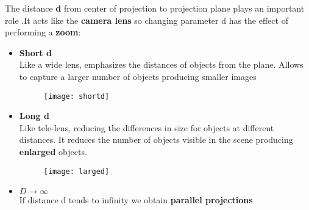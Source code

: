 The distance \textbf{d} from center of projection to projection plane plays an important role .It acts like the \textbf{camera lens}  so changing parameter d has the effect of performing a \textbf{zoom}:\\
\begin{itemize}
\item \textbf{Short d}\\
Like a wide lens, emphasizes the distances of objects from the plane.
Allows to capture a larger number of objects producing smaller images
\begin{figure}[H]
 \centering
  \texttt{[image: shortd]}
\end{figure}
\item \textbf{Long d}\\
Like tele-lens, reducing the differences in size for objects at different distances.
It reduces the number of objects visible in the scene producing \textbf{enlarged} objects.
\begin{figure}[H]
 \centering
  \texttt{[image: larged]}
\end{figure}
\item  $D \to \infty$\\
If distance d tends to infinity we obtain \textbf{parallel projections}
\end{itemize}

